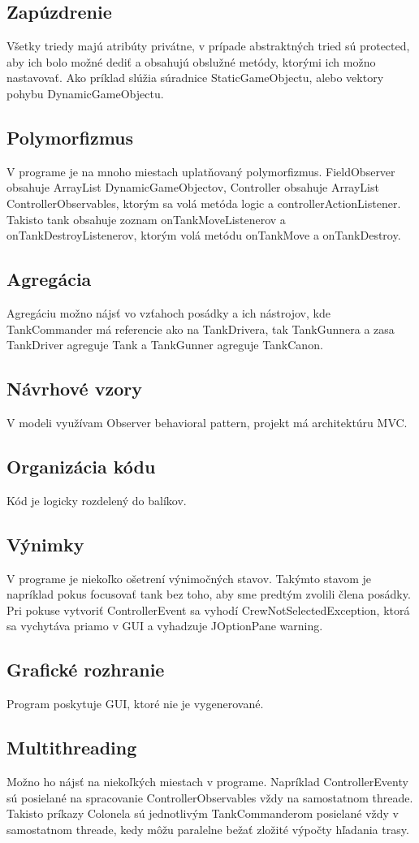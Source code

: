 \documentclass[12pt,oneside,slovak,a4paper]{article}
\begin{document}
\subsection{Zapúzdrenie}
Všetky triedy majú atribúty privátne, v prípade abstraktných tried sú protected, aby ich bolo možné dediť a obsahujú obslužné metódy, ktorými ich možno nastavovať. Ako príklad slúžia súradnice StaticGameObjectu, alebo vektory pohybu DynamicGameObjectu.
\subsection{Polymorfizmus}
V programe je na mnoho miestach uplatňovaný polymorfizmus. FieldObserver obsahuje ArrayList DynamicGameObjectov, Controller obsahuje ArrayList ControllerObservables, ktorým sa volá metóda logic a controllerActionListener. Takisto tank obsahuje zoznam onTankMoveListenerov a onTankDestroyListenerov, ktorým volá metódu onTankMove a onTankDestroy.
\subsection{Agregácia}
Agregáciu možno nájsť vo vzťahoch posádky a ich nástrojov, kde TankCommander má referencie ako na TankDrivera, tak TankGunnera a zasa TankDriver agreguje Tank a TankGunner agreguje TankCanon.
\subsection{Návrhové vzory}
V modeli využívam Observer behavioral pattern, projekt má architektúru MVC.
\subsection{Organizácia kódu}
Kód je logicky rozdelený do balíkov.
\subsection{Výnimky}
V programe je niekoľko ošetrení výnimočných stavov. Takýmto stavom je napríklad pokus focusovať tank bez toho, aby sme predtým zvolili člena posádky. Pri pokuse vytvoriť ControllerEvent sa vyhodí CrewNotSelectedException, ktorá sa vychytáva priamo v GUI a vyhadzuje JOptionPane warning.
\subsection{Grafické rozhranie}
Program poskytuje GUI, ktoré nie je vygenerované.
\subsection{Multithreading}
Možno ho nájsť na niekoľkých miestach v programe. Napríklad ControllerEventy sú posielané na spracovanie ControllerObservables vždy na samostatnom threade. Takisto príkazy Colonela sú jednotlivým TankCommanderom posielané vždy v samostatnom threade, kedy môžu paralelne bežať zložité výpočty hľadania trasy.
\end{document}

